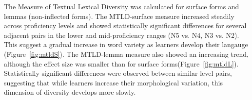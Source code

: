 
The Measure of Textual Lexical Diversity was calculated for surface forms and lemmas (non-inflected forms). The
MTLD-surface measure increased steadily across proficiency levels and showed statistically significant differences
for several adjacent pairs in the lower and mid-proficiency ranges (N5 vs. N4, N3 vs. N2). This suggest a gradual
increase in word variety as learners develop their langauge (Figure~\ref{fig:mtldS}). The MTLD-lemma measure also
showed an increasing trend, although the effect size was smaller than for surface forms(Figure~\ref{fig:mtldL}). Statistically
significant
differences were observed between similar level pairs, suggesting that while learners increase their morphological
variation, this dimension of diversity develops more slowly.


